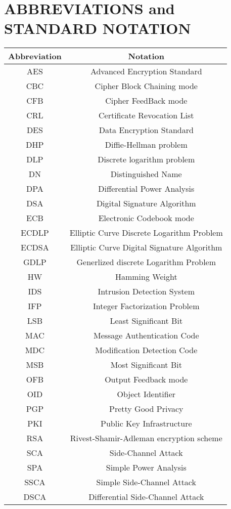 \documentclass[a4paper, 10 pt, conference]{ieeeconf}
\begin{document}
\section{ABBREVIATIONS and STANDARD NOTATION}
\begin{table}[h!]
    \begin{center}
    \begin{tabular}{c c} %
        \toprule
       Abbreviation & Notation \\
        \midrule
        AES & Advanced Encryption Standard \\
        CBC & Cipher Block Chaining mode \\
        CFB & Cipher FeedBack mode\\
        CRL & Certificate Revocation List\\
        DES & Data Encryption Standard \\
        DHP & Diffie-Hellman problem \\
        DLP & Discrete logarithm problem \\
        DN & Distinguished Name \\
        DPA & Differential Power Analysis \\
        DSA & Digital Signature Algorithm \\
        ECB & Electronic Codebook mode \\
        ECDLP & Elliptic Curve Discrete Logarithm Problem \\
        ECDSA & Elliptic Curve Digital Signature Algorithm \\
        GDLP & Generlized discrete Logarithm Problem \\
        HW & Hamming Weight \\
        IDS & Intrusion Detection System \\
        IFP & Integer Factorization Problem \\
        LSB & Least Significant Bit \\
        MAC & Message Authentication Code \\
        MDC & Modification Detection Code \\
        MSB & Most Significant Bit \\
        OFB & Output Feedback mode \\
        OID & Object Identifier \\
        PGP & Pretty Good Privacy \\
        PKI & Public Key Infrastructure \\
        RSA & Rivest-Shamir-Adleman encryption scheme \\
        SCA & Side-Channel Attack \\
        SPA & Simple Power Analysis \\
        SSCA & Simple Side-Channel Attack \\
        DSCA & Differential Side-Channel Attack \\
        \bottomrule
    \end{tabular}
    \end{center}
\end{table}
\end{document}
